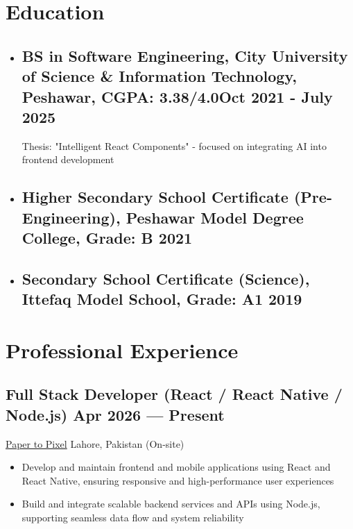 \documentclass[a4,10pt]{article}
\newcommand{\subtext}[1]{
#1\par\vspace{-0.2cm}}
\newenvironment{zitemize}{
\begin{itemize}\itemsep0pt \parskip0pt \parsep1pt}
{\end{itemize}\vspace{-0.5cm}}
\begin{document}
\section{Education}
\begin{itemize}
    \item \subsection*{ BS in Software Engineering, {\normalsize \normalfont City University of Science \& Information Technology, Peshawar, CGPA: 3.38/4.0}\hfill Oct 2021 - July 2025}
    \subtext{Thesis: "Intelligent React Components" - focused on integrating AI into frontend development}
    \item \subsection*{ Higher Secondary School Certificate (Pre-Engineering), {\normalsize \normalfont Peshawar Model Degree College, Grade: B} \hfill 2021}
    \item \subsection*{ Secondary School Certificate (Science), {\normalsize \normalfont Ittefaq Model School, Grade: A1} \hfill 2019} 
\end{itemize}
\vspace{0.05cm}

\section{Professional Experience}

\subsection*{Full Stack Developer (React / React Native / Node.js) {\normalsize\normalfont} \hfill Apr 2026 --- Present} 
\subtext{\href{https://papertopixel.co/}{Paper to Pixel} \hfill Lahore, Pakistan (On-site)} 
    \begin{zitemize}
        \item Develop and maintain frontend and mobile applications using React and React Native, ensuring responsive and high-performance user experiences
        \item Build and integrate scalable backend services and APIs using Node.js, supporting seamless data flow and system reliability
    \end{zitemize}
\end{document}
